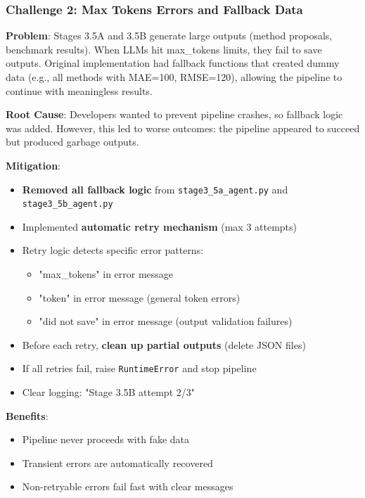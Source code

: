 \documentclass[11pt,a4paper]{article}
\begin{document}
\subsubsection{Challenge 2: Max Tokens Errors and Fallback Data}

\textbf{Problem}: Stages 3.5A and 3.5B generate large outputs (method proposals, benchmark results). When LLMs hit max\_tokens limits, they fail to save outputs. Original implementation had fallback functions that created dummy data (e.g., all methods with MAE=100, RMSE=120), allowing the pipeline to continue with meaningless results.

\textbf{Root Cause}: Developers wanted to prevent pipeline crashes, so fallback logic was added. However, this led to worse outcomes: the pipeline appeared to succeed but produced garbage outputs.

\textbf{Mitigation}:
\begin{itemize}
    \item \textbf{Removed all fallback logic} from \texttt{stage3\_5a\_agent.py} and \texttt{stage3\_5b\_agent.py}
    \item Implemented \textbf{automatic retry mechanism} (max 3 attempts)
    \item Retry logic detects specific error patterns:
    \begin{itemize}
        \item "max\_tokens" in error message
        \item "token" in error message (general token errors)
        \item "did not save" in error message (output validation failures)
    \end{itemize}
    \item Before each retry, \textbf{clean up partial outputs} (delete JSON files)
    \item If all retries fail, raise \texttt{RuntimeError} and stop pipeline
    \item Clear logging: "Stage 3.5B attempt 2/3"
\end{itemize}

\textbf{Benefits}:
\begin{itemize}
    \item Pipeline never proceeds with fake data
    \item Transient errors are automatically recovered
    \item Non-retryable errors fail fast with clear messages
\end{itemize}
\end{document}
